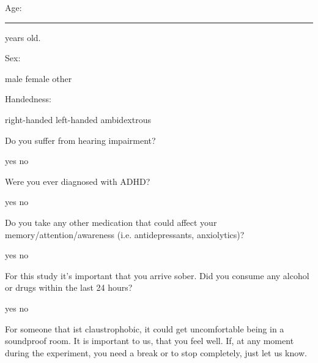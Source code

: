 \documentclass[a4paper,12pt,addpoints]{exam}
\begin{document}
\begin{questions}
  \question Age: \rule{2cm}{0.6pt} years old.

  \question Sex:
  \begin{oneparcheckboxes}
   \choice male
   \choice female
   \choice other
  \end{oneparcheckboxes}

  \question Handedness:
  \begin{oneparcheckboxes}
   \choice right-handed
   \choice left-handed
   \choice ambidextrous
  \end{oneparcheckboxes}

  \question Do you suffer from hearing impairment?
  \begin{oneparcheckboxes}
   \choice yes
   \choice no
  \end{oneparcheckboxes}

  \question Were you ever diagnosed with ADHD?
  \begin{oneparcheckboxes}
   \choice yes
   \choice no
  \end{oneparcheckboxes}


\question Do you take any other medication that could affect your memory/attention/awareness (i.e. antidepressants, anxiolytics)?
  \begin{oneparcheckboxes}
   \choice yes
   \choice no
  \end{oneparcheckboxes}

\question For this study it's important that you arrive sober. Did you consume any alcohol or drugs within the last 24 hours?
  \begin{oneparcheckboxes}
   \choice yes
   \choice no
  \end{oneparcheckboxes}


\end{questions}

\noindent For someone that ist claustrophobic, it could get uncomfortable being in a soundproof room. It is important to us, that you feel well. If, at any moment during the experiment, you need a break or to stop completely, just let us know.\\
\end{document}
